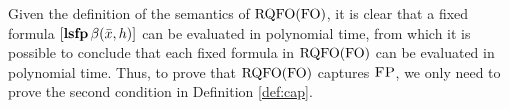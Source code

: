 Given the definition of the semantics of ${\rm RQFO}({\rm FO})$, it is clear that a fixed formula $[{\bf lsfp} \, \beta(\bar{x}, h)]$ can be evaluated in polynomial time, from which it is possible to conclude that each fixed formula in ${\rm RQFO}({\rm FO})$ can be evaluated in polynomial time. Thus, to prove that ${\rm RQFO}({\rm FO})$ captures $\text{\sc FP}$, we only need to prove the second condition in Definition \ref{def:cap}.
%
%
%
%
